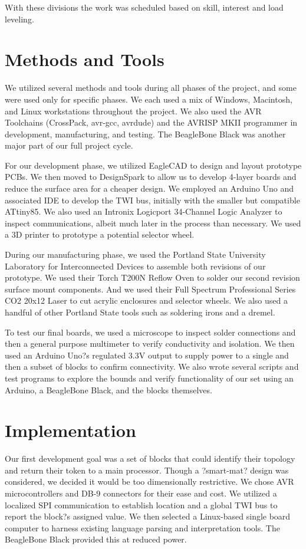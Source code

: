 \documentclass[12pt,a4paper]{article}
\begin{document}
With these divisions the work was scheduled based on skill, interest and load leveling.


\section{Methods and Tools}
We utilized several methods and tools during all phases of the project, and some were used only for specific phases. We each used a mix of Windows, Macintosh, and Linux workstations throughout the project. We also used the AVR Toolchains (CrossPack, avr-gcc, avrdude) and the AVRISP MKII programmer in development, manufacturing, and testing. The BeagleBone Black was another major part of our full project cycle.

For our development phase, we utilized EagleCAD to design and layout prototype PCBs. We then moved to DesignSpark to allow us to develop 4-layer boards and reduce the surface area for a cheaper design. We employed an Arduino Uno and associated IDE to develop the TWI bus, initially with the smaller but compatible ATtiny85. We also used an Intronix Logicport 34-Channel Logic Analyzer to inspect communications, albeit much later in the process than necessary. We used a 3D printer to prototype a potential selector wheel.

During our manufacturing phase, we used the Portland State University Laboratory for Interconnected Devices to assemble both revisions of our prototype. We used their Torch T200N Reflow Oven to solder our second revision surface mount components. And we used their Full Spectrum Professional Series CO2 20x12 Laser to cut acrylic enclosures and selector wheels. We also used a handful of other Portland State tools such as soldering irons and a dremel. 

To test our final boards, we used a microscope to inspect solder connections and then a general purpose multimeter to verify conductivity and isolation. We then used an Arduino Uno?s regulated 3.3V output to supply power to a single and then a subset of blocks to confirm connectivity. We also wrote several scripts and test programs to explore the bounds and verify functionality of our set using an Arduino, a BeagleBone Black, and the blocks themselves.
\section{Implementation}
Our first development goal was a set of blocks that could identify their topology and return their token to a main processor. Though a ?smart-mat? design was considered, we decided it would be too dimensionally restrictive. We chose AVR microcontrollers and DB-9 connectors for their ease and cost. We utilized a localized SPI communication to establish location and a global TWI bus to report the block?s assigned value. We then selected a Linux-based single board computer to harness existing language parsing and interpretation tools. The BeagleBone Black provided this at reduced power.
\end{document}
